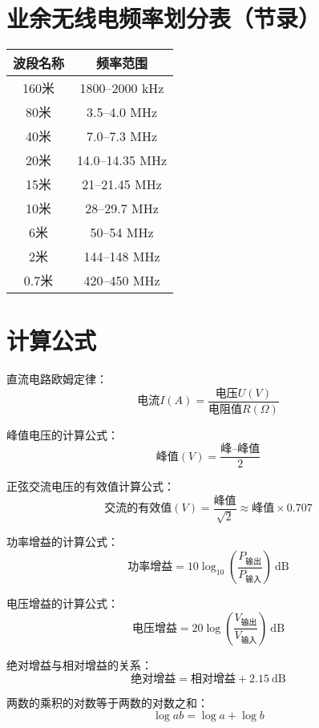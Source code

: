 \newpage






\section{业余无线电频率划分表（节录）}


\begin{longtable}{|c|c|}
	\hline
	\textbf{波段名称} & \textbf{频率范围} \\
	\hline
	160米 & 1800–2000 kHz \\
	\hline
	80米 & 3.5–4.0 MHz \\
	\hline
	40米 & 7.0–7.3 MHz \\
	\hline
	20米 & 14.0–14.35 MHz \\
	\hline
	15米 & 21–21.45 MHz \\
	\hline
	10米 & 28–29.7 MHz \\
	\hline
	6米 & 50–54 MHz \\
	\hline
	2米 & 144–148 MHz \\
	\hline
	0.7米 & 420–450 MHz \\
	\hline
\end{longtable}

\newpage

\section{计算公式}

直流电路欧姆定律：
$$\mbox{电流}I(A)=\frac{\mbox{电压}U(V)}{\mbox{电阻值}R(\Omega)}$$

峰值电压的计算公式：
$$\mbox{峰值}(V)=\frac{\mbox{峰--峰值}}{2}$$

正弦交流电压的有效值计算公式：
$$\mbox{交流的有效值}(V)=\frac{\mbox{峰值}}{\sqrt{2}} \approx \mbox{峰值}\times0.707$$

功率增益的计算公式：
$$\mbox{功率增益}=10 \log_{10} \left( {\frac{P_{ \mbox{输出} }}{P_{ \mbox{输入} }}}\right)\ \mathrm{dB}$$

电压增益的计算公式：
$$\mbox{电压增益}=20 \log \left( {\frac{V_{ \mbox{输出} }}{V_{ \mbox{输入} }}} \right)\ \mathrm{dB}$$


绝对增益与相对增益的关系：
$$\mbox{绝对增益} = \mbox{相对增益} + 2.15 \ \mathrm{dB}$$

两数的乘积的对数等于两数的对数之和：
$$\log ab=\log a+\log b$$

